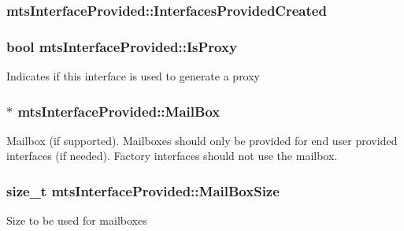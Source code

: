 \subsubsection[{Interfaces\+Provided\+Created}]{ mts\+Interface\+Provided\+::\+Interfaces\+Provided\+Created\hspace{0.3cm}{\ttfamily [protected]}}\label{classmts_interface_provided_abb4914957812afdf0fd27c620cd609a4}
\hypertarget{classmts_interface_provided_ae1d453e5968c61939ab1a7b8a94389f0}{}
\subsubsection[{Is\+Proxy}]{\setlength{\rightskip}{0pt plus 5cm}bool mts\+Interface\+Provided\+::\+Is\+Proxy\hspace{0.3cm}{\ttfamily [protected]}}\label{classmts_interface_provided_ae1d453e5968c61939ab1a7b8a94389f0}
Indicates if this interface is used to generate a proxy \hypertarget{classmts_interface_provided_a99b2ef9d3dec51002e722415589628bb}{}
\subsubsection[{Mail\+Box}]{$\ast$ mts\+Interface\+Provided\+::\+Mail\+Box\hspace{0.3cm}{\ttfamily [protected]}}\label{classmts_interface_provided_a99b2ef9d3dec51002e722415589628bb}
Mailbox (if supported). Mailboxes should only be provided for end user provided interfaces (if needed). Factory interfaces should not use the mailbox. \hypertarget{classmts_interface_provided_a5defbf0829c6a36bbf33baf52ec8f2f0}{}
\subsubsection[{Mail\+Box\+Size}]{\setlength{\rightskip}{0pt plus 5cm}size\+\_\+t mts\+Interface\+Provided\+::\+Mail\+Box\+Size\hspace{0.3cm}{\ttfamily [protected]}}\label{classmts_interface_provided_a5defbf0829c6a36bbf33baf52ec8f2f0}
Size to be used for mailboxes \hypertarget{classmts_interface_provided_aa3c7fd4efc804d522edf06f02aaf646e}{}
